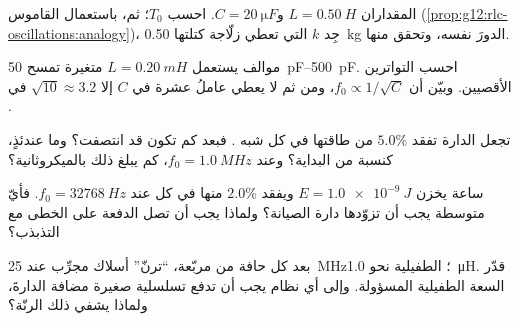 \begin{exercise}[$\star\star$]\label{exo:g12:rlc-oscillations:11}
 المقداران $L = \qty{0.50}{H}$ و$C = \qty{20}{\micro F}$.
احسب $T_0$؛ ثم، باستعمال القاموس
(\cref{prop:g12:rlc-oscillations:analogy})، جِد  $k$
التي تعطي زلّاجة كتلتها \qty{0.50}{kg} الدورَ نفسه، وتحقق منها.
\end{exercise}

\begin{exercise}[$\star\star\star$]\label{exo:g12:rlc-oscillations:12}
موالف يستعمل $L = \qty{0.20}{mH}$  متغيرة تمسح
\qtyrange{50}{500}{pF}. احسب التواترين الأقصيين. وبيّن أن
$f_0 \propto 1/\sqrt{C}$، ومن ثم لا يعطي عاملُ عشرة في $C$ إلا
$\sqrt{10} \approx 3.2$ في .
\end{exercise}

\begin{exercise}[$\star\star\star$]\label{exo:g12:rlc-oscillations:13}
  تجعل الدارة تفقد $5.0\%$ من طاقتها في كل
شبه . فبعد كم  تكون  قد انتصفت؟ وما
 عندئذٍ، كنسبة من البداية؟ وعند
$f_0 = \qty{1.0}{MHz}$، كم يبلغ ذلك بالميكروثانية؟
\end{exercise}

\begin{exercise}[$\star\star\star$]\label{exo:g12:rlc-oscillations:14}
 ساعة يخزن $E = \qty{1.0e-9}{J}$ ويفقد $2.0\%$ منها
في كل  عند $f_0 = \qty{32768}{Hz}$. فأيّ  متوسطة يجب أن
تزوّدها دارة الصيانة؟ ولماذا يجب أن تصل الدفعة على الخطى
مع التذبذب؟
\end{exercise}

\begin{exercise}[$\star\star\star$]\label{exo:g12:rlc-oscillations:15}
بعد كل حافة من  مربّعة، ``ترنّ'' أسلاك مجرِّب
عند \qty{25}{MHz}؛  الطفيلية نحو \qty{1.0}{\micro H}.
قدّر السعة الطفيلية المسؤولة. وإلى أي نظام يجب أن تدفع
 تسلسلية صغيرة مضافة الدارةَ، ولماذا يشفي ذلك
الرنّة؟
\end{exercise}


